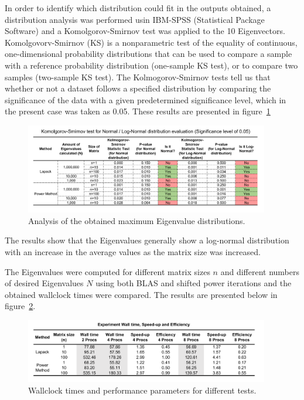 \documentclass[11pt, oneside]{article}
\begin{document}
        In order to identify which distribution could fit in the outputs obtained, a distribution analysis was performed usin IBM-SPSS (Statistical Package Software) and a Komolgorov-Smirnov test was applied to the 10 Eigenvectors. Komolgovorv-Smirnov (KS) is a nonparametric test of the equality of continuous, one-dimensional probability distributions that can be used to compare a sample with a reference probability distribution (one-sample KS test), or to compare two samples (two-sample KS test). The Kolmogorov-Smirnov tests tell us that whether or not a dataset follows a specified distribution by comparing the significance of the data with a given predetermined significance level, which in the present case was taken as 0.05. These results are presented in figure~\ref{fig:3}
        \begin{figure}[h]
		\centering
		\includegraphics[width=0.95\textwidth]{Figures/tab_test.png}
		\caption{Analysis of the obtained maximum Eigenvalue distributions.}
		\label{fig:3}
	\end{figure}
The results show that the Eigenvalues generally show a log-normal distribution with an increase in the average values as the matrix size was increased.        

The Eigenvalues were computed for different matrix sizes $n$ and different numbers of desired Eigenvalues $N$ using both BLAS and shifted power iterations and the obtained wallclock times were compared. The results are presented below in  figure~\ref{fig:walltime}.
        	\begin{figure}[h]
		\centering
		\includegraphics[width=0.95\textwidth]{Figures/eff.png}
		\caption{Wallclock times and performance parameters for different tests.}
		\label{fig:walltime}
	        \end{figure}
\end{document}
